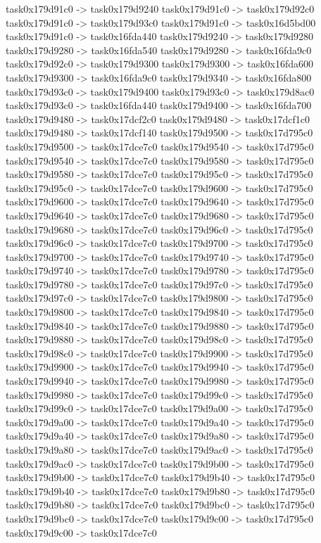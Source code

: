 {	task0x179d91c0 -> task0x179d9240
	task0x179d91c0 -> task0x179d92c0
	task0x179d91c0 -> task0x179d93c0
	task0x179d91c0 -> task0x16d5bd00
	task0x179d91c0 -> task0x16fda440
	task0x179d9240 -> task0x179d9280
	task0x179d9280 -> task0x16fda540
	task0x179d9280 -> task0x16fda9c0
	task0x179d92c0 -> task0x179d9300
	task0x179d9300 -> task0x16fda600
	task0x179d9300 -> task0x16fda9c0
	task0x179d9340 -> task0x16fda800
	task0x179d93c0 -> task0x179d9400
	task0x179d93c0 -> task0x179d8ac0
	task0x179d93c0 -> task0x16fda440
	task0x179d9400 -> task0x16fda700
	task0x179d9480 -> task0x17dcf2c0
	task0x179d9480 -> task0x17dcf1c0
	task0x179d9480 -> task0x17dcf140
	task0x179d9500 -> task0x17d795c0
	task0x179d9500 -> task0x17dce7c0
	task0x179d9540 -> task0x17d795c0
	task0x179d9540 -> task0x17dce7c0
	task0x179d9580 -> task0x17d795c0
	task0x179d9580 -> task0x17dce7c0
	task0x179d95c0 -> task0x17d795c0
	task0x179d95c0 -> task0x17dce7c0
	task0x179d9600 -> task0x17d795c0
	task0x179d9600 -> task0x17dce7c0
	task0x179d9640 -> task0x17d795c0
	task0x179d9640 -> task0x17dce7c0
	task0x179d9680 -> task0x17d795c0
	task0x179d9680 -> task0x17dce7c0
	task0x179d96c0 -> task0x17d795c0
	task0x179d96c0 -> task0x17dce7c0
	task0x179d9700 -> task0x17d795c0
	task0x179d9700 -> task0x17dce7c0
	task0x179d9740 -> task0x17d795c0
	task0x179d9740 -> task0x17dce7c0
	task0x179d9780 -> task0x17d795c0
	task0x179d9780 -> task0x17dce7c0
	task0x179d97c0 -> task0x17d795c0
	task0x179d97c0 -> task0x17dce7c0
	task0x179d9800 -> task0x17d795c0
	task0x179d9800 -> task0x17dce7c0
	task0x179d9840 -> task0x17d795c0
	task0x179d9840 -> task0x17dce7c0
	task0x179d9880 -> task0x17d795c0
	task0x179d9880 -> task0x17dce7c0
	task0x179d98c0 -> task0x17d795c0
	task0x179d98c0 -> task0x17dce7c0
	task0x179d9900 -> task0x17d795c0
	task0x179d9900 -> task0x17dce7c0
	task0x179d9940 -> task0x17d795c0
	task0x179d9940 -> task0x17dce7c0
	task0x179d9980 -> task0x17d795c0
	task0x179d9980 -> task0x17dce7c0
	task0x179d99c0 -> task0x17d795c0
	task0x179d99c0 -> task0x17dce7c0
	task0x179d9a00 -> task0x17d795c0
	task0x179d9a00 -> task0x17dce7c0
	task0x179d9a40 -> task0x17d795c0
	task0x179d9a40 -> task0x17dce7c0
	task0x179d9a80 -> task0x17d795c0
	task0x179d9a80 -> task0x17dce7c0
	task0x179d9ac0 -> task0x17d795c0
	task0x179d9ac0 -> task0x17dce7c0
	task0x179d9b00 -> task0x17d795c0
	task0x179d9b00 -> task0x17dce7c0
	task0x179d9b40 -> task0x17d795c0
	task0x179d9b40 -> task0x17dce7c0
	task0x179d9b80 -> task0x17d795c0
	task0x179d9b80 -> task0x17dce7c0
	task0x179d9bc0 -> task0x17d795c0
	task0x179d9bc0 -> task0x17dce7c0
	task0x179d9c00 -> task0x17d795c0
	task0x179d9c00 -> task0x17dce7c0
}
